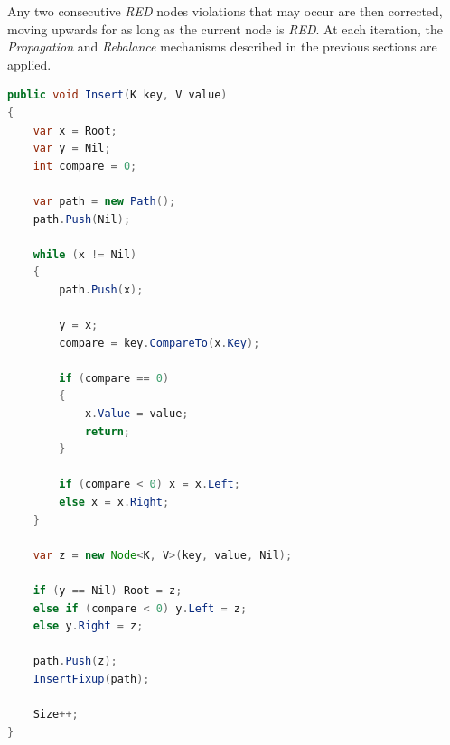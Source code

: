 \documentclass{article}
\begin{document}
Any two consecutive \emph{RED} nodes violations that may occur are then corrected, moving upwards for as long as the
current node is \emph{RED}. At each iteration, the \emph{Propagation} and \emph{Rebalance} mechanisms described in the
previous sections are applied.

\begin{lstlisting}[language=java]
public void Insert(K key, V value)
{
    var x = Root;
    var y = Nil;
    int compare = 0;

    var path = new Path();
    path.Push(Nil);

    while (x != Nil)
    {
        path.Push(x);

        y = x;
        compare = key.CompareTo(x.Key);

        if (compare == 0)
        {
            x.Value = value;
            return;
        }

        if (compare < 0) x = x.Left;
        else x = x.Right;
    }

    var z = new Node<K, V>(key, value, Nil);

    if (y == Nil) Root = z;
    else if (compare < 0) y.Left = z;
    else y.Right = z;

    path.Push(z);
    InsertFixup(path);

    Size++;
}
\end{lstlisting}
\end{document}
